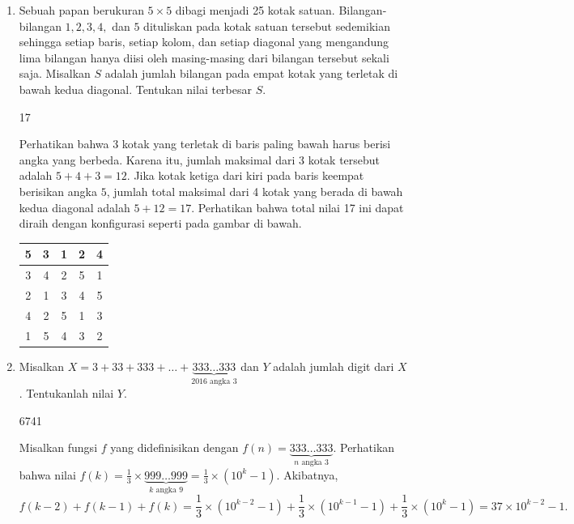 \documentclass[12pt]{scrartcl}
\begin{document}
\begin{enumerate}[resume]
    \item Sebuah papan berukuran $5 \times 5$ dibagi menjadi 25 kotak satuan. Bilangan-bilangan $1,2,3,4,$ dan $5$ dituliskan pada kotak satuan tersebut sedemikian sehingga setiap baris, setiap kolom, dan setiap diagonal yang mengandung lima bilangan hanya diisi oleh masing-masing dari bilangan tersebut sekali saja. Misalkan $S$ adalah jumlah bilangan pada empat kotak yang terletak di bawah kedua diagonal. Tentukan nilai terbesar $S$.
    \begin{jawaban}
	17
    \end{jawaban}
    \begin{solusi}
	Perhatikan bahwa 3 kotak yang terletak di baris paling bawah harus berisi angka yang berbeda. Karena itu, jumlah maksimal dari 3 kotak tersebut adalah $5+4+3=12$. Jika kotak ketiga dari kiri pada baris keempat berisikan angka $5$, jumlah total maksimal dari 4 kotak yang berada di bawah kedua diagonal adalah $5+12=17$. Perhatikan bahwa total nilai 17 ini dapat diraih dengan konfigurasi seperti pada gambar di bawah.
    \begin{center} 
    \begin{tabular}{ |c|c|c|c|c| }
        \hline
        5 & 3 & 1 & 2 & 4 \\
        \hline
        3 & 4 & 2 & 5 & 1 \\
        \hline
        2 & 1 & 3 & 4 & 5 \\
        \hline
        4 & 2 & \cellcolor{green!30}5 & 1 & 3 \\
        \hline
        1 &\cellcolor{green!30}5 &\cellcolor{green!30}4 &\cellcolor{green!30}3 & 2 \\
        \hline
    \end{tabular}
    \end{center}
    \end{solusi}
	
    \item Misalkan $X = 3 + 33 + 333 + \dots + \underbrace{333 \dots 333}_{2016 \text{ angka } 3}$ dan $Y$ adalah jumlah digit dari $X$. Tentukanlah nilai $Y$.
    \begin{jawaban}
        6741
    \end{jawaban}
    \begin{solusi}
        Misalkan fungsi $f$ yang didefinisikan dengan $f(n)=\underbrace{333\dots 333}_{n \text{ angka } 3}$. Perhatikan bahwa nilai $f(k)=\frac{1}{3}\times \underbrace{999 \dots 999}_{k \text{ angka } 9} = \frac{1}{3}\times (10^k-1)$. Akibatnya, $$f(k-2)+f(k-1)+f(k)=\frac{1}{3}\times (10^{k-2}-1)+\frac{1}{3}\times (10^{k-1}-1)+\frac{1}{3}\times (10^k-1)=37\times 10^{k-2}-1.$$
        

\end{solusi}
\end{enumerate}
\end{document}
